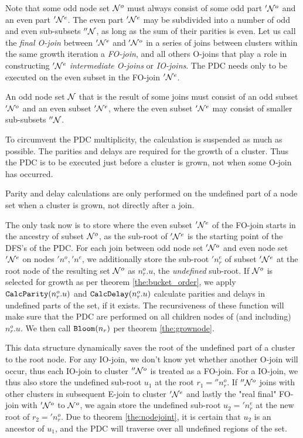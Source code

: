 Note that some odd node set $\mathcal{N}^o$ must always consist of some odd part $'\mathcal{N}^o$ and an even part $'\mathcal{N}^e$. The even part $'\mathcal{N}^e$ may be subdivided into a number of odd and even sub-subsets $''\mathcal{N}$, as long as the sum of their parities is even. Let us call the \emph{final O-join} between $'\mathcal{N}^e$ and $'\mathcal{N}^o$ in a series of joins between clusters within the same growth iteration a \emph{FO-join}, and all others O-joins that play a role in constructing $'\mathcal{N}^e$ \emph{intermediate O-joins} or \emph{IO-joins}. The PDC needs only to be executed on the even subset in the FO-join $'\mathcal{N}^e$.
\begin{lemma}\label{lem:oddisevenodd}
  An odd node set $\mathcal{N}$ that is the result of some joins must consist of an odd subset $'\mathcal{N}^o$ and an even subset $'\mathcal{N}^e$, where the even subset $'\mathcal{N}^e$ may consist of smaller sub-subsets $''\mathcal{N}$.
\end{lemma}
To circumvent the PDC multiplicity, the calculation is suspended as much as possible. The parities and delays are required for the growth of a cluster. Thus the PDC is to be executed just before a cluster is grown, not when some O-join has occurred.
\begin{lemma}\label{lem:delaywhengrown}
  Parity and delay calculations are only performed on the undefined part of a node set when a cluster is grown, not directly after a join.
\end{lemma}

The only task now is to store where the even subset $'\mathcal{N}^e$ of the FO-join starts in the ancestry of subset $\mathcal{N}^o$, as the sub-root of $'\mathcal{N}^e$ is the starting point of the DFS's of the PDC. For each join between odd node set $'\mathcal{N}^o$ and even node set $'\mathcal{N}^e$ on nodes $'n^o, 'n^e$, we additionally store the sub-root $'n^e_r$ of subset $'\mathcal{N}^e$ at the root node of the resulting set $\mathcal{N}^{o}$ as $n^{o}_r.u$, the \emph{undefined} sub-root. If $\mathcal{N}^{o}$ is selected for growth as per theorem \ref{the:bucket_order}, we apply $\texttt{CalcParity}(n^{o}_r.u)$ and $\texttt{CalcDelay}(n^{o}_r.u)$ calculate parities and delays in undefined parts of the set, if it exists. The recursiveness of these function will make sure that the PDC are performed on all children nodes of (and including) $n^{o}_r.u$. We then call $\texttt{Bloom}(n_r)$ per theorem \ref{the:grownode}.

This data structure dynamically saves the root of the undefined part of a cluster to the root node. For any IO-join, we don't know yet whether another O-join will occur, thus each IO-join to cluster $''\mathcal{N}^o$ is treated as a FO-join. For a IO-join, we thus also store the undefined sub-root $u_1$ at the root $r_1=''n_r^o$. If $''\mathcal{N}^o$ joins with other clusters in subsequent E-join to cluster $'\mathcal{N}^e$ and lastly the "real final" FO-join with $'\mathcal{N}^o$ to $\mathcal{N}^o$, we again store the undefined sub-root $u_2='n_r^e$ at the new root of $r_2='n_r^o$. Due to theorem \ref{the:nodejoint}, it is certain that $u_2$ is an ancestor of $u_1$, and the PDC will traverse over all undefined regions of the set.


